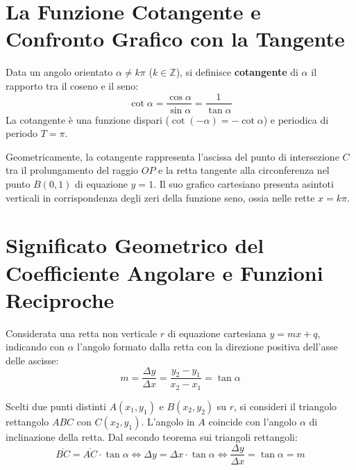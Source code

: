 \documentclass[11pt,a4paper,oneside]{report}
\begin{document}
\section{La Funzione Cotangente e Confronto Grafico con la Tangente}

\begin{definizione}
Data un angolo orientato $\alpha \neq k\pi$ ($k \in \mathbb{Z}$), si definisce \textbf{cotangente} di $\alpha$ il rapporto tra il coseno e il seno:
\begin{equation}
\cot\alpha = \frac{\cos\alpha}{\sin\alpha} = \frac{1}{\tan\alpha}
\end{equation}
La cotangente \`e una funzione dispari ($\cot(-\alpha) = -\cot\alpha$) e periodica di periodo $T = \pi$.
\end{definizione}

Geometricamente, la cotangente rappresenta l'ascissa del punto di intersezione $C$ tra il prolungamento del raggio $OP$ e la retta tangente alla circonferenza nel punto $B(0, 1)$ di equazione $y = 1$. Il suo grafico cartesiano presenta asintoti verticali in corrispondenza degli zeri della funzione seno, ossia nelle rette $x = k\pi$.

\section{Significato Geometrico del Coefficiente Angolare e Funzioni Reciproche}

\begin{teorema}
Considerata una retta non verticale $r$ di equazione cartesiana $y = mx + q$, indicando con $\alpha$ l'angolo formato dalla retta con la direzione positiva dell'asse delle ascisse:
\begin{equation}
m = \frac{\Delta y}{\Delta x} = \frac{y_2 - y_1}{x_2 - x_1} = \tan\alpha
\end{equation}
\end{teorema}
\begin{dimostrazione}
Scelti due punti distinti $A(x_1, y_1)$ e $B(x_2, y_2)$ su $r$, si consideri il triangolo rettangolo $ABC$ con $C(x_2, y_1)$. L'angolo in $A$ coincide con l'angolo $\alpha$ di inclinazione della retta. Dal secondo teorema sui triangoli rettangoli:
\begin{equation}
\overline{BC} = \overline{AC} \cdot \tan\alpha \iff \Delta y = \Delta x \cdot \tan\alpha \iff \frac{\Delta y}{\Delta x} = \tan\alpha = m
\end{equation}
\end{dimostrazione}
\end{document}
